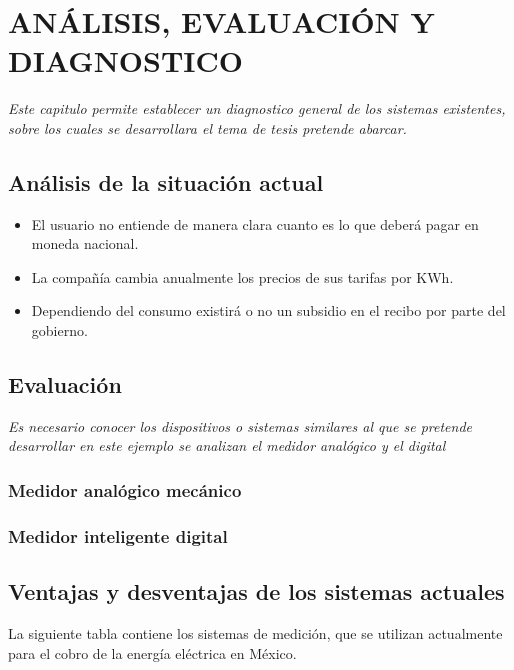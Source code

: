 \chapter{ ANÁLISIS, EVALUACIÓN Y DIAGNOSTICO }

\textit{Este capitulo permite establecer un diagnostico general de los sistemas existentes, sobre los cuales se desarrollara el tema de tesis pretende abarcar.}

\section{ Análisis de la situación actual }

\begin{itemize}
	\item  El usuario no entiende de manera clara cuanto es lo que deberá pagar en moneda nacional.

    \item La compañía cambia anualmente los precios de sus tarifas por \gls{KWh}.
    
    \item Dependiendo del consumo existirá o no un subsidio en el recibo por parte del gobierno.
    
\end{itemize}

\section{ Evaluación }

    \textit{Es necesario conocer los dispositivos o sistemas similares al que se pretende desarrollar en este ejemplo se analizan el medidor analógico y el digital}

\subsection{ Medidor analógico mecánico }
    
\subsection{ Medidor inteligente digital }

\section{ Ventajas y desventajas de los sistemas actuales }
    
    La siguiente tabla contiene los sistemas de medición, que se utilizan actualmente para el cobro de la energía eléctrica en México.
    
